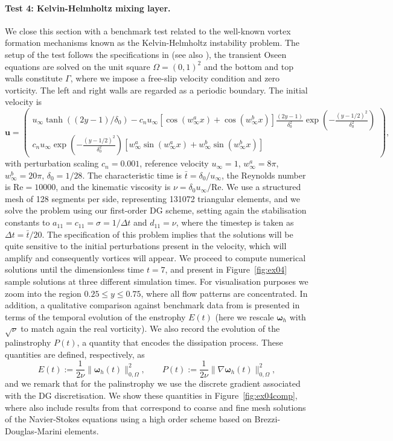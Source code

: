 \documentclass[reqno,a4paper]{article}
\numberwithin{equation}{section}
\newcommand\bu{\boldsymbol{u}}
\newcommand\bomega{\boldsymbol{\omega}}
\begin{document}
\paragraph{Test 4: Kelvin-Helmholtz mixing layer.} We close this section with a 
benchmark test related to the well-known vortex formation mechanisms known as the 
Kelvin-Helmholtz instability problem. The setup of the test follows the specifications 
in \cite{schroeder18} (see also \cite{burman17}), the transient Oseen equations are 
solved on the unit square $\Omega=(0,1)^2$ and the bottom and top walls constitute 
$\Gamma$, where we impose a 
free-slip velocity condition and zero vorticity. The left and right walls are regarded as a periodic boundary. 
The initial velocity is 
$$\bu = \begin{pmatrix}
u_{\infty}\tanh((2y-1)/\delta_0) - c_n u_{\infty}[\cos(w^a_{\infty}x)+\cos(w_{\infty}^bx)]\frac{(2y-1)}{\delta_0^2} \exp(-\frac{(y-1/2)^2}{\delta_0^2})\\
c_n u_{\infty} \exp(-\frac{(y-1/2)^2}{\delta_0^2})[w_{\infty}^a\sin(w_{\infty}^a x)+w_{\infty}^b\sin(w_{\infty}^bx)]\end{pmatrix},$$
with perturbation scaling $c_n = 0.001$, reference velocity $u_\infty = 1$, $w_{\infty}^a = 8\pi$, $w_{\infty}^b = 20\pi$, $\delta_0 = 1/28$. The 
characteristic time is $\bar{t}=\delta_0/u_{\infty}$, the Reynolds number is Re$=10000$, and the kinematic viscosity is $\nu = \delta_0u_{\infty}/\text{Re}$. 
We use a structured mesh of 128 segments per side, representing 131072 triangular elements, and we solve the problem 
using our first-order DG scheme, setting again the stabilisation constants to $a_{11}=c_{11}=\sigma= 1/\Delta t$ and $d_{11}=\nu$, 
where the timestep is taken as $\Delta t = \bar{t}/20$. The specification of this problem implies 
that the solutions will be quite sensitive to the initial 
perturbations present in the velocity, which will amplify and consequently vortices will appear. We proceed 
to compute numerical solutions until the dimensionless time $t = 7$, and present in Figure~\ref{fig:ex04} sample 
solutions at three different simulation times. For visualisation purposes we zoom into the region $0.25 \leq y \leq 0.75$, where 
all flow patterns are concentrated. 
In addition, a qualitative comparison against benchmark 
data from \cite{schroeder18} is presented in terms of the temporal evolution of the enstrophy $E(t)$ (here we rescale $\bomega_h$ 
with $\sqrt{\nu}$ to match again the real vorticity). We also record the evolution of the palinstrophy $P(t)$, 
a quantity that encodes the dissipation process.  These quantities are defined, respectively, as 
$$E(t):=\frac{1}{2\nu}  \| \bomega_h(t) \|^2_{0,\Omega},\qquad 
P(t):=\frac{1}{2\nu}  \| \nabla\bomega_h(t) \|^2_{0,\Omega},$$
and we remark that for the palinstrophy we use the discrete gradient associated with the DG discretisation.  
We show these quantities in Figure~\ref{fig:ex04comp}, where also include 
results from \cite{schroeder18} that correspond to coarse and fine mesh solutions of the Navier-Stokes equations 
using a high order scheme based on Brezzi-Douglas-Marini elements. 
\end{document}
